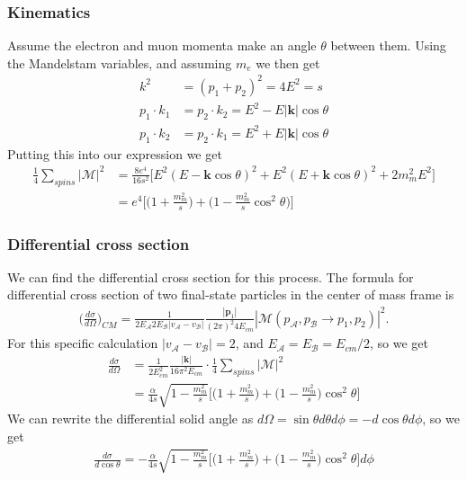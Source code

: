 \documentclass[11pt]{article}
\begin{document}
\subsubsection{Kinematics}
\begin{flushleft}
Assume the electron and muon momenta make an angle $\theta$ between them. Using the Mandelstam variables, and assuming $m_e$ we then get
\begin{align*}
k^2 &= (p_1 + p_2)^2 = 4E^2 = s\\
p_1 \cdot k_1 &= p_2 \cdot k_2 = E^2 - E|\textbf{k}| \cos \theta\\
p_1 \cdot k_2 &= p_2 \cdot k_1 = E^2 + E|\textbf{k}| \cos \theta
\end{align*}
Putting this into our expression we get
\begin{align*}
\frac{1}{4} \sum_{spins} |\mathcal{M}|^2 &= \frac{8e^4}{16s^2} \Big[E^2(E -\textbf{k} \cos \theta)^2 + E^2 (E +\textbf{k} \cos \theta)^2 + 2m_m^2 E^2 \Big]\\
&= e^4 \Big[ \Big(1 + \frac{m_m^2}{s} \Big) + \Big(1 - \frac{m_m^2}{s} \cos^2 \theta \Big) \Big]
\end{align*}
\end{flushleft}

\subsubsection{Differential cross section}
\begin{flushleft}
We can find the differential cross section for this process. The formula for differential cross section of two final-state particles in the center of mass frame is
\begin{align*}
\Big( \frac{d \sigma}{d \Omega} \Big)_{CM} = \frac{1}{2E_{\mathcal{A}}2 E_{\mathcal{B}} |v_{\mathcal{A}}-v_{\mathcal{B}}|} \frac{|\textbf{p}_1|}{(2 \pi)^2 4 E_{cm}}|\mathcal{M}(p_{\mathcal{A}}, p_{\mathcal{B}} \rightarrow p_1, p_2)|^2.
\end{align*}
For this specific calculation $|v_{\mathcal{A}}-v_{\mathcal{B}}|=2$, and $E_{\mathcal{A}}=E_{\mathcal{B}}= E_{cm}/2$, so we get
\begin{align*}
\frac{d \sigma}{d \Omega} &= \frac{1}{2 E_{cm}^2} \frac{|\textbf{k}|}{16 \pi^2 E_{cm}} \cdot \frac{1}{4} \sum_{spins} |\mathcal{M}|^2\\
&= \frac{\alpha}{4 s} \sqrt{1 - \frac{m_m^2}{s}} \Big[ \Big( 1 + \frac{m_m^2}{s}\Big) + \Big( 1 - \frac{m_m^2}{s}\Big) \cos^2 \theta \Big]
\end{align*}
We can rewrite the differential solid angle as $d \Omega = \sin \theta d \theta d \phi = - d \cos \theta d \phi$, so we get
\begin{align*}
\frac{d \sigma}{d \cos \theta} = - \frac{\alpha}{4 s} \sqrt{1 - \frac{m_m^2}{s}} \Big[ \Big( 1 + \frac{m_m^2}{s}\Big) + \Big( 1 - \frac{m_m^2}{s}\Big) \cos^2 \theta \Big] d \phi
\end{align*}
\end{flushleft}
\end{document}
